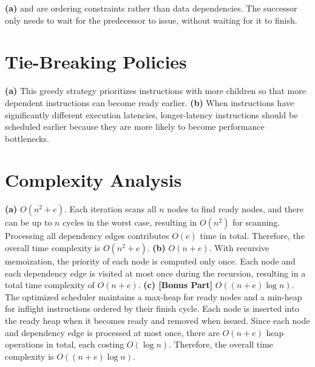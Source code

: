 \documentclass[11pt]{article}
\begin{document}
\textbf{(a)}  and  are ordering constraints rather than data dependencies. The successor only needs to wait for the predecessor to issue, without waiting for it to finish.

\section{Tie-Breaking Policies}
\textbf{(a)} This greedy strategy prioritizes instructions with more children so that more dependent instructions can become ready earlier.
\newline
\textbf{(b)} When instructions have significantly different execution latencies, longer-latency instructions should be scheduled earlier because they are more likely to become performance bottlenecks.

\section{Complexity Analysis}
\textbf{(a)} $O(n^2 + e)$. \newline
Each iteration scans all $n$ nodes to find ready nodes, and there can be up to $n$ cycles in the worst case, resulting in $O(n^2)$ for scanning. Processing all dependency edges contributes $O(e)$ time in total. Therefore, the overall time complexity is $O(n^2 + e)$.
\newline
\textbf{(b)} $O(n + e)$. \newline
With recursive memoization, the priority of each node is computed only once. Each node and each dependency edge is visited at most once during the recursion, resulting in a total time complexity of $O(n + e)$.
\newline
\textbf{(c) [Bonus Part]} $O((n + e) \log n)$. \newline
The optimized scheduler maintains a max-heap for ready nodes and a min-heap for inflight instructions ordered by their finish cycle. Each node is inserted into the ready heap when it becomes ready and removed when issued. Since each node and dependency edge is processed at most once, there are $O(n + e)$ heap operations in total, each costing $O(\log n)$. Therefore, the overall time complexity is $O((n + e)\log n)$.
\end{document}
